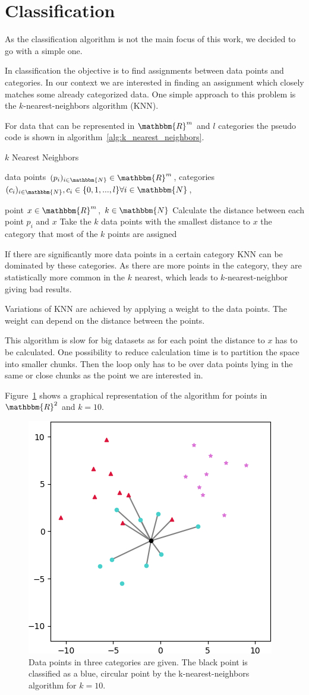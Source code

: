 \newpage

\section{Classification}
\label{sec:classification}

As the classification algorithm is not the main focus of this work, we decided to go with a simple one.

In classification the objective is to find assignments between data points and categories. In our context we are interested in finding an assignment which closely matches some already categorized data. One simple approach to this problem is the $k$-nearest-neighbors algorithm (KNN).

For data that can be represented in $\mathbbm{R}^m$ and $l$ categories the pseudo code is shown in algorithm~\ref{alg:k_nearest_neighbors}.

\begin{algorithm}
	\caption{$k$ Nearest Neighbors}\label{alg:k_nearest_neighbors}
	\begin{algorithmic}
		\Require data points $(p_i)_{i \in \mathbbm{N}} \in \mathbbm{R}^{m}$, categories $(c_i)_{i \in \mathbbm{N}}, c_i \in \{0, 1, ..., l\} \forall i \in \mathbbm{N}$,
		
		point $x \in \mathbbm{R}^{m}$, $k \in \mathbbm{N}$
		\State Calculate the distance between each point $p_i$ and $x$
		\State Take the $k$ data points with the smallest distance to $x$
		\State \Return the category that most of the $k$ points are assigned
	\end{algorithmic}
\end{algorithm}

If there are significantly more data points in a certain category KNN can be dominated by these categories. As there are more points in the category, they are statistically more common in the $k$ nearest, which leads to $k$-nearest-neighbor giving bad results.

Variations of KNN are achieved by applying a weight to the data points. The weight can depend on the distance between the points.

This algorithm is slow for big datasets as for each point the distance to $x$ has to be calculated. One possibility to reduce calculation time is to partition the space into smaller chunks. Then the loop only has to be over data points lying in the same or close chunks as the point we are interested in.

Figure~\ref{fig:k_nearest_neighbors} shows a graphical representation of the algorithm for points in $\mathbbm{R}^2$ and ${k=10}$.

\begin{figure}
	\centering
	\includegraphics[width=0.45\linewidth]{figs/k_nearest_neighbors}
	\caption{Data points in three categories are given. The black point is classified as a blue, circular point by the k-nearest-neighbors algorithm for $k=10$.}
	\label{fig:k_nearest_neighbors}
\end{figure}